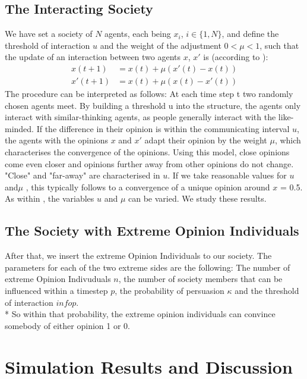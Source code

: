 \documentclass[11pt]{article}
\begin{document}
\subsection{The Interacting Society}
We have set a society of $N$ agents, each being $x_i$, $i \in \{1, N \}$, and define the threshold of interaction $u$ and the weight of the adjustment $0 < \mu < 1$, such that the update of an interaction between two agents $x$, $x'$ is (according to \cite{Minor}):
\begin{equation}
\begin{aligned}
x(t+1) &= x(t) + \mu(x'(t) - x(t))  \\
x'(t+1) &= x(t) + \mu(x(t) - x'(t)) 
\end{aligned}
\end{equation}
The procedure can be interpreted as follows: At each time step t two randomly chosen agents meet. By building a threshold u into the structure, the agents only interact with similar-thinking agents, as people generally interact with the like-minded. If the difference in their opinion is within the communicating interval $u$, the agents with the opinions $x$ and $x'$ adapt their opinion by the weight $\mu$, which characterises the convergence of the opinions. Using this model, close opinions come even closer and opinions further away from other opinions do not change. "Close" and "far-away" are characterised in $u$. If we take reasonable values for $u$ and$\mu$ , this typically follows to a convergence of a unique opinion around $x$ = 0.5.
As within \cite{Minor}, the variables $u$ and $\mu$ can be varied. We study these results.

\subsection{The Society with Extreme Opinion Individuals}
After that, we insert the extreme Opinion Individuals to our society. The parameters for each of the two extreme sides are the following: The number of extreme Opinion Indivuduals $n$, the number of society members that can be influenced within a timestep $p$, the probability of persuasion $\kappa$ and the threshold of interaction $infop$. \\*
So within that probability, the extreme opinion individuals can convince somebody of either opinion 1 or 0.


\section{Simulation Results and Discussion}
\end{document}
